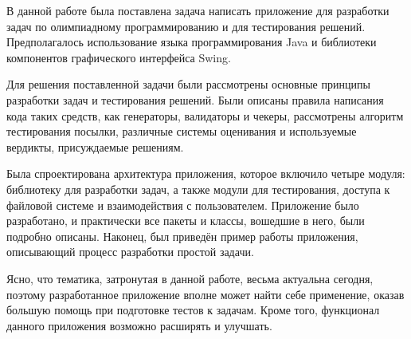 В данной работе была поставлена задача написать приложение для разработки задач по олимпиадному программированию и для тестирования решений. Предполагалось использование языка программирования Java и библиотеки компонентов графического интерфейса Swing.

Для решения поставленной задачи были рассмотрены основные принципы разработки задач и тестирования решений. Были описаны правила написания кода таких средств, как генераторы, валидаторы и чекеры, рассмотрены алгоритм тестирования посылки, различные системы оценивания и используемые вердикты, присуждаемые решениям.

Была спроектирована архитектура приложения, которое включило четыре модуля: библиотеку для разработки задач, а также модули для тестирования, доступа к файловой системе и взаимодействия с пользователем. Приложение было разработано, и практически все пакеты и классы, вошедшие в него, были подробно описаны. Наконец, был приведён пример работы приложения, описывающий процесс разработки простой задачи.

Ясно, что тематика, затронутая в данной работе, весьма актуальна сегодня, поэтому разработанное приложение вполне может найти себе применение, оказав большую помощь при подготовке тестов к задачам. Кроме того, функционал данного приложения возможно расширять и улучшать.



